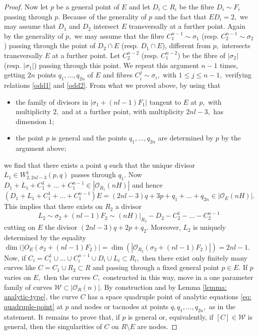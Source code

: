 \documentclass[plain]{amsart}
\begin{document}
\begin{proof}
Now let $p$ be a general point of $E$ and let $D_i\subset R_i$ be the fibre $D_i\sim F_i$ passing through 
$p.$ Because of the generality of $p$ and the fact that $ED_i=2,$ we may assume that $D_1$ and $D_2$ 
intersect $E$ transversally at a further point. Again by the generality of $p,$ we may assume that the fibre
 $C^{n-1}_1 \sim \sigma_1$ (resp. $C^{n-1}_2 \sim \sigma_2$)
passing through the point of $D_2\cap E$ (resp. $D_1\cap E$), different from $p,$ 
intersects transversally $E$ at a further point.
Let $C^{n-2}_2$ (resp. $C^{n-2}_1$) be
the fibre of $|\sigma_2|$ (resp. $|\sigma_1|$) passing through this point. We repeat this argument $n-1$ times,
getting $2n$ points $q_1,...,q_{2n}$ of $E$ and fibres $C^{j}_i\sim\sigma_i,$ with $1\leq j\leq n-1,$
verifying relations \eqref{odd1} and \eqref{odd2}. From what we proved above,
by using that 
\begin{itemize}
\item the family of divisors in $|\sigma_1+(nl-1)F_1|$ tangent to $E$ at $p,$ with 
multiplicity $2,$ and at a further point, with multiplicity $2nl-3,$ has dimension $1;$ 
\item the point $p$ is general and the points $q_1,...,q_{2n}$ are determined by $p$
by the argument above;
\end{itemize}
we find that there exists a point $q$ such that the unique divisor $L_1\in W^1_{2,2nl-3}(p,q)$
passes through $q_1.$ Now $D_1+L_1+C_1^1+...+C_1^{n-1}\in |\mathcal O_{R_1}(nH)|$
and hence $(D_1+L_1+C_1^1+...+C_1^{n-1})E=(2nl-3)q+3p+q_1+\dots+q_{2n}\in |\mathcal O_{E}(nH)|.$
This implies that there exists on $R_2$ a divisor 
$$L_2\sim \sigma_2+(nl-1)F_2\sim (nH)|_{R_2}-D_2-C_2^1-...-C_2^{n-1}$$
cutting on $E$ the divisor $(2nl-3)q+2p+q_2.$ Moreover, $L_2$ is uniquely determined 
by the equality $\dim(|O_E(\sigma_2+(nl-1)F_2)|=\dim(|\mathcal O_{R_2}(\sigma_2+(nl-1)F_2)|)=2nl-1.$
Now, if $C_i=  C_i^1\cup...\cup C_i^{n-1}\cup D_i\cup L_i\subset R_i,$ then there exist only finitely many curves
like $C=C_1\cup R_2\subset R$ and passing through a fixed general point $p\in E.$  
 If $p$ varies on $E,$ then the curves $C,$ constructed in this way, move in a one parameter family
of curves $\mathcal W\subset |\mathcal O_R(n)|.$ By construction and by Lemma \ref{lemma: analytic-type},
 the curve $C$ has a space quadruple point of analytic equations  \eqref{eq: quadruple-point} at $p$ and nodes or tacnodes
 at points $q,q_1,...,q_{2n},$ as in the statement.
It remains to prove that, if $p$ is general or, equivalently,
if $[C]\in\mathcal W$ is general, then the singularities of $C$ on $R\setminus E$ are nodes.

\end{proof}
\end{document}

